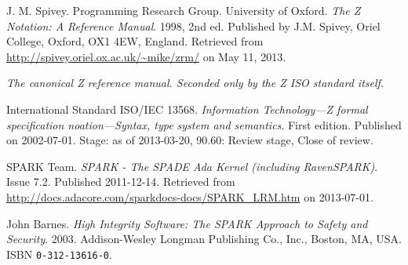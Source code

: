 \begin{thebibliography}{9} %


J. M. Spivey. Programming Research Group. University of Oxford. \emph{The Z
Notation: A Reference Manual}. 1998, 2nd ed. Published by J.M. Spivey, Oriel
College, Oxford, OX1 4EW, England. Retrieved from
\url{http://spivey.oriel.ox.ac.uk/~mike/zrm/} on May 11, 2013.

\emph{The canonical Z reference manual. Seconded only by the Z ISO standard
itself.}


International Standard ISO/IEC 13568. \emph{Information Technology---Z formal
specification noation---Syntax, type system and semantics}. First edition.
Published on 2002-07-01. Stage: as of 2013-03-20, 90.60: Review stage, Close of
review.


SPARK Team. \emph{SPARK - The SPADE Ada Kernel (including RavenSPARK)}. Issue
7.2. Published 2011-12-14. Retrieved from
\url{http://docs.adacore.com/sparkdocs-docs/SPARK_LRM.htm} on 2013-07-01.


John Barnes. \emph{High Integrity Software: The SPARK Approach to Safety and
Security}. 2003. Addison-Wesley Longman Publishing Co., Inc., Boston, MA, USA.
ISBN \texttt{0-312-13616-0}.

\end{thebibliography}

